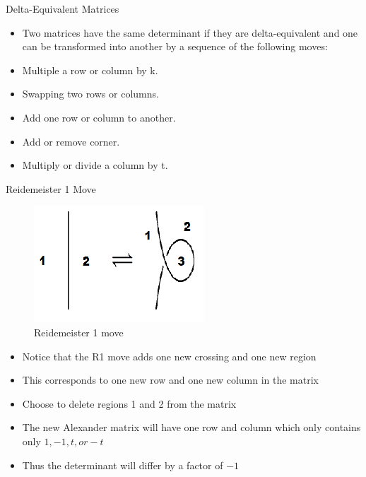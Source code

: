 \documentclass[10pt]{beamer}
\begin{document}
\begin{frame}[fragile]{Delta-Equivalent Matrices}
\begin{itemize}
\item Two matrices have the same determinant if they are delta-equivalent and one can be transformed into another by a sequence of the following moves:
\item Multiple a row or column by k.
\item Swapping two rows or columns.
\item Add one row or column to another.
\item Add or remove corner.
\item Multiply or divide a column by t.
\end{itemize}
\end{frame}



\begin{frame}[fragile]{Reidemeister 1 Move}
     \begin{figure}
     \includegraphics[scale=0.5]{R1.png}
      \caption{Reidemeister 1 move}
\end{figure}  
\begin{itemize}
\item Notice that the R1 move adds one new crossing and one new region
\item This corresponds to one new row and one new column in the matrix
\item Choose to delete regions 1 and 2 from the matrix 
\item The new Alexander matrix will have one row and column which only contains only $1, -1, t, or -t$ 
\item Thus the determinant will differ by a factor of $  -1 $
\end{itemize}
\end{frame}
\end{document}
